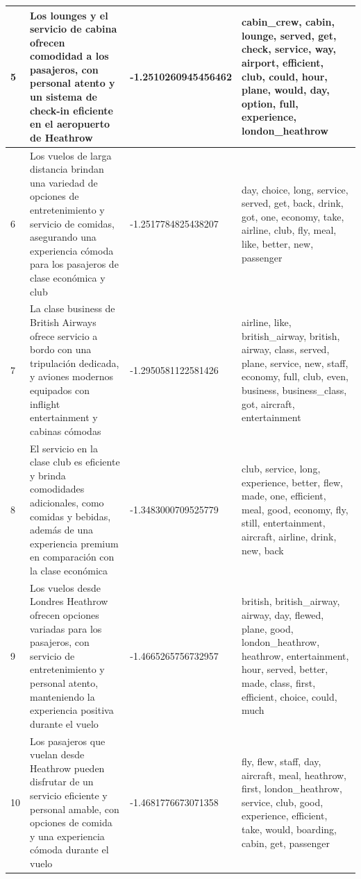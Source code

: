 \documentclass{report}
\begin{document}
{\begin{longtable}{|p{1cm}|p{4cm}|p{4cm}|p{6cm}|}
                    \hline
                    5 & Los lounges y el servicio de cabina ofrecen comodidad a los pasajeros, con personal atento y un sistema de check-in eficiente en el aeropuerto de Heathrow & -1.2510260945456462 & cabin\_crew, cabin, lounge, served, get, check, service, way, airport, efficient, club, could, hour, plane, would, day, option, full, experience, london\_heathrow \\
                    \hline
                    6 & Los vuelos de larga distancia brindan una variedad de opciones de entretenimiento y servicio de comidas, asegurando una experiencia cómoda para los pasajeros de clase económica y club & -1.2517784825438207 & day, choice, long, service, served, get, back, drink, got, one, economy, take, airline, club, fly, meal, like, better, new, passenger \\
                    \hline
                    7 & La clase business de British Airways ofrece servicio a bordo con una tripulación dedicada, y aviones modernos equipados con inflight entertainment y cabinas cómodas & -1.2950581122581426 & airline, like, british\_airway, british, airway, class, served, plane, service, new, staff, economy, full, club, even, business, business\_class, got, aircraft, entertainment \\
                    \hline
                    8 & El servicio en la clase club es eficiente y brinda comodidades adicionales, como comidas y bebidas, además de una experiencia premium en comparación con la clase económica & -1.3483000709525779 & club, service, long, experience, better, flew, made, one, efficient, meal, good, economy, fly, still, entertainment, aircraft, airline, drink, new, back \\
                    \hline
                    9 & Los vuelos desde Londres Heathrow ofrecen opciones variadas para los pasajeros, con servicio de entretenimiento y personal atento, manteniendo la experiencia positiva durante el vuelo & -1.4665265756732957 & british, british\_airway, airway, day, flewed, plane, good, london\_heathrow, heathrow, entertainment, hour, served, better, made, class, first, efficient, choice, could, much \\
                    \hline
                    10 & Los pasajeros que vuelan desde Heathrow pueden disfrutar de un servicio eficiente y personal amable, con opciones de comida y una experiencia cómoda durante el vuelo & -1.4681776673071358 & fly, flew, staff, day, aircraft, meal, heathrow, first, london\_heathrow, service, club, good, experience, efficient, take, would, boarding, cabin, get, passenger \\

\end{longtable}}
\end{document}
